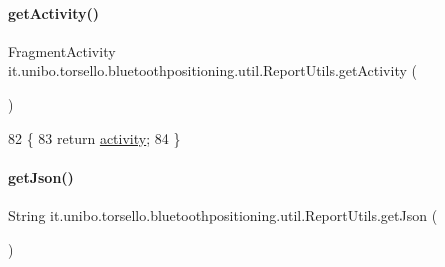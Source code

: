 \paragraph{\texorpdfstring{get\+Activity()}{getActivity()}}
{\footnotesize\ttfamily Fragment\+Activity it.\+unibo.\+torsello.\+bluetoothpositioning.\+util.\+Report\+Utils.\+get\+Activity (\begin{DoxyParamCaption}{ }\end{DoxyParamCaption})}


\begin{DoxyCode}
82                                           \{
83         \textcolor{keywordflow}{return} \hyperlink{classit_1_1unibo_1_1torsello_1_1bluetoothpositioning_1_1util_1_1ReportUtils_ae36eb3321f2d7f96753d7854f5cb6923_ae36eb3321f2d7f96753d7854f5cb6923}{activity};
84     \}
\end{DoxyCode}
\hypertarget{classit_1_1unibo_1_1torsello_1_1bluetoothpositioning_1_1util_1_1ReportUtils_a768356af2517bb604a39daf2497fc761_a768356af2517bb604a39daf2497fc761}{}\label{classit_1_1unibo_1_1torsello_1_1bluetoothpositioning_1_1util_1_1ReportUtils_a768356af2517bb604a39daf2497fc761_a768356af2517bb604a39daf2497fc761} 
\paragraph{\texorpdfstring{get\+Json()}{getJson()}}
{\footnotesize\ttfamily String it.\+unibo.\+torsello.\+bluetoothpositioning.\+util.\+Report\+Utils.\+get\+Json (\begin{DoxyParamCaption}{ }\end{DoxyParamCaption})}


